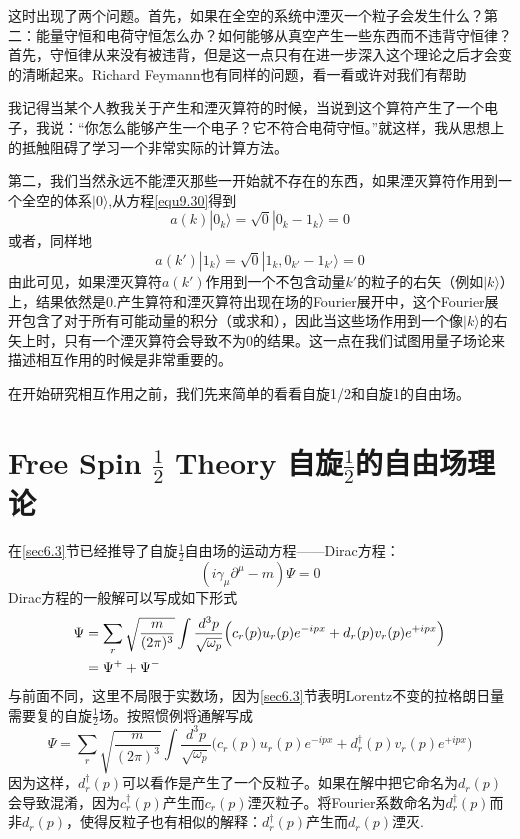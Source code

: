 这时出现了两个问题。首先，如果在全空的系统中湮灭一个粒子会发生什么？第二：能量守恒和电荷守恒怎么办？如何能够从真空产生一些东西而不违背守恒律？首先，守恒律从来没有被违背，但是这一点只有在进一步深入这个理论之后才会变的清晰起来。Richard Feymann也有同样的问题，看一看或许对我们有帮助\\
\begin{center}
\parbox{0.9\textwidth}{\small 我记得当某个人教我关于产生和湮灭算符的时候，当说到这个算符产生了一个电子，我说：“你怎么能够产生一个电子？它不符合电荷守恒。”就这样，我从思想上的抵触阻碍了学习一个非常实际的计算方法。}
\end{center}\vspace{4mm}
第二，我们当然永远不能湮灭那些一开始就不存在的东西，如果湮灭算符作用到一个全空的体系$|0\rangle$,从方程\eqref{equ9.30}得到
\begin{equation}
\label{equ9.31}
	a(k)|0_{k} \rangle=\sqrt{0}|0_{k}-1_{k} \rangle=0
\end{equation}
或者，同样地
\begin{equation}
\label{equ9.32}
	a(k')|1_{k} \rangle=\sqrt{0}|1_{k}, 0_{k'} - 1_{k'} \rangle=0
\end{equation}
由此可见，如果湮灭算符$a(k')$作用到一个不包含动量$k'$的粒子的右矢（例如$|k\rangle$）上，结果依然是$0$.产生算符和湮灭算符出现在场的Fourier展开中，这个Fourier展开包含了对于所有可能动量的积分（或求和），因此当这些场作用到一个像$|k\rangle$的右矢上时，只有一个湮灭算符会导致不为0的结果。这一点在我们试图用量子场论来描述相互作用的时候是非常重要的。

在开始研究相互作用之前，我们先来简单的看看自旋1/2和自旋1的自由场。

\section[自由的自旋$\frac{1}{2}$理论]{Free Spin $\frac{1}{2}$ Theory \quad 自旋$\frac{1}{2}$的自由场理论}
\label{sec9.3}
在\ref{sec6.3}节已经推导了自旋$\frac{1}{2}$自由场的运动方程——Dirac方程：
$$(i\gamma_{\mu}\partial^{\mu}-m)\Psi=0$$
Dirac方程的一般解可以写成如下形式
\begin{align}
	\Psi &= \sum_{r} \sqrt{ \frac{m}{(2\pi)^{3}} }\int \frac{d^{3}p}{\sqrt{\omega_{p}}} \Big( c_{r}(p)u_{r}(p)e^{-ipx}+d_{r}(p)v_{r}(p)e^{+ipx} \Big)  \label{equ9.33} \\
	& =\Psi^{+}+\Psi^{-} \notag
\end{align}
与前面不同，这里不局限于实数场，因为\ref{sec6.3}节表明Lorentz不变的拉格朗日量需要复的自旋$\frac{1}{2}$场。按照惯例将通解写成
\begin{equation}\label{equ9.34}
	\Psi = \sum_{r} \sqrt{\frac{m}{(2\pi)^{3}}}\int \frac{d^{3}p}{\sqrt{\omega_{p}}} \Big( c_{r}(p)u_{r}(p)e^{-ipx}+d^{\dagger}_{r}(p)v_{r}(p)e^{+ipx} \Big)
\end{equation}
因为这样，$d^{\dagger}_{r}(p)$可以看作是产生了一个反粒子。如果在解中把它命名为$d_{r}(p)$会导致混淆，因为$c^{\dagger}_{r}(p)$产生而$c_{r}(p)$湮灭粒子。将Fourier系数命名为$d_{r}^{\dagger}(p)$而非$d_{r}(p)$，使得反粒子也有相似的解释：$d^{\dagger}_{r}(p)$产生而$d_{r}(p)$湮灭.

